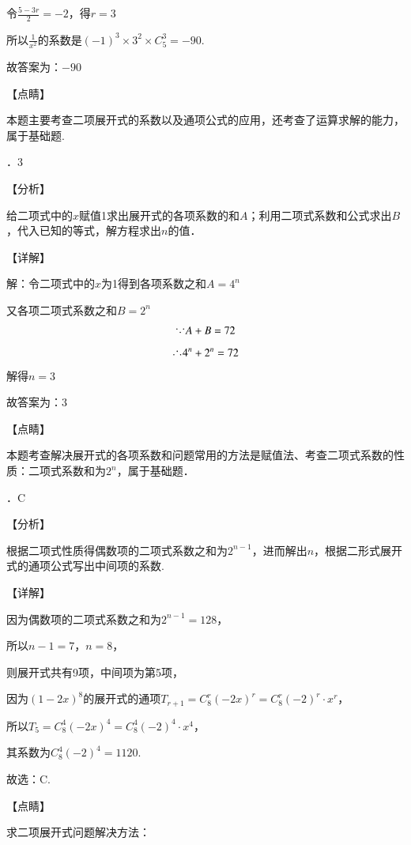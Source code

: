 \documentclass[a4paper,11pt,UTF8,twoside]{ctexart} %
\begin{document}
\noindent 令$\frac{5-3r}{2} =-2$，得$r=3$

\noindent 所以$\frac{1}{x^{2} } $的系数是$\left(-1\right)^{3} \times 3^{2} \times C_{5}^{3} =-90$.

\noindent 故答案为：$-90$

\noindent 【点睛】

\noindent 本题主要考查二项展开式的系数以及通项公式的应用，还考查了运算求解的能力，属于基础题.

．3

\noindent 【分析】

\noindent 给二项式中的$x$赋值1求出展开式的各项系数的和$A$；利用二项式系数和公式求出$B$，代入已知的等式，解方程求出$n$的值．

\noindent 【详解】

\noindent 解：令二项式中的$x$为1得到各项系数之和$A=4^{n} $

\noindent 又各项二项式系数之和$B=2^{n} $
\[{\mkern1mu\raise4pt\hbox{.}\mkern1mu\raise1pt\hbox{.}\mkern1mu\raise4pt\hbox{.}\mkern1mu} A+B=72\] 
\[{\mkern1mu\raise1pt\hbox{.}\mkern1mu\raise4pt\hbox{.}\mkern1mu\raise1pt\hbox{.}\mkern1mu} 4^{n} +2^{n} =72\] 
解得$n=3$

\noindent 故答案为：3

\noindent 【点睛】

\noindent 本题考查解决展开式的各项系数和问题常用的方法是赋值法、考查二项式系数的性质：二项式系数和为$2^{n} $，属于基础题．

．C

\noindent 【分析】

\noindent 根据二项式性质得偶数项的二项式系数之和为$2^{n-1} $，进而解出$n$，根据二形式展开式的通项公式写出中间项的系数.

\noindent 【详解】

\noindent 因为偶数项的二项式系数之和为$2^{n-1} =128$，

\noindent 所以$n-1=7$，$n=8$，

\noindent 则展开式共有9项，中间项为第5项，

\noindent 因为$(1-2x)^{8} $的展开式的通项$T_{r+1} =C_{8}^{r} (-2x)^{r} =C_{8}^{r} (-2)^{r} \cdot x^{r} $，

\noindent 所以$T_{5} =C_{8}^{4} (-2x)^{4} =C_{8}^{4} (-2)^{4} \cdot x^{4} $，

\noindent 其系数为$C_{8}^{4} (-2)^{4} =1120$.

\noindent 故选：C.

\noindent 【点睛】

\noindent 求二项展开式问题解决方法：
\end{document}
